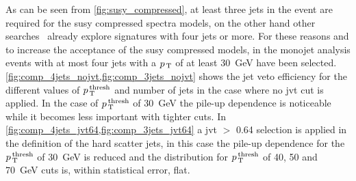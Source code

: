 As can be seen from \cref{fig:susy_compressed}, at least three jets in the event
are required for the \gls{susy} compressed spectra models, on the other hand
other searches~\cite{MultijetSUSY} already explore signatures with four jets or
more. For these reasons and to increase the acceptance of the \gls{susy}
compressed models, in the monojet analysis events with at most four jets with a
$p_\mathrm{\, T}$ of at least 30~GeV have been selected.
\cref{fig:comp_4jets_nojvt,fig:comp_3jets_nojvt} shows the jet veto efficiency
for the different values of $p_\mathrm{\, T}^{\mathrm{\, thresh}}$ and number of jets in the
case where no \gls{jvt} cut is applied. In the case of
$p_\mathrm{\, T}^{\mathrm{\, thresh}}$ of 30~GeV the pile-up dependence is noticeable while
it becomes less important with tighter cuts. In
\cref{fig:comp_4jets_jvt64,fig:comp_3jets_jvt64} a \gls{jvt} $>$ 0.64 selection
is applied in the definition of the hard scatter jets, in this case the pile-up
dependence for the $p_\mathrm{\, T}^{\mathrm{\, thresh}}$ of 30~GeV is reduced and the
distribution for $p_\mathrm{\, T}^{\mathrm{\, thresh}}$ of 40, 50 and 70~GeV cuts is, within
statistical error, flat.
